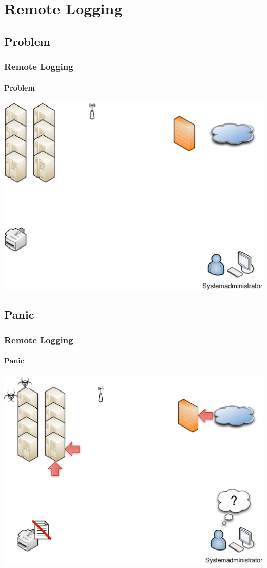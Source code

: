 \section{Remote Logging}
\subsection{Problem}
\begin{frame}[plain]
	\frametitle{Remote Logging}
	\framesubtitle{Problem}
	\begin{center}
		\includegraphics[width=\linewidth]{images/remote_logging_01.eps}
	\end{center}
\end{frame}

\subsection{Panic}
\begin{frame}[plain]
	\frametitle{Remote Logging}
	\framesubtitle{Panic}
	\begin{center}
		\includegraphics[width=\linewidth]{images/remote_logging_02.eps}
	\end{center}
\end{frame}

